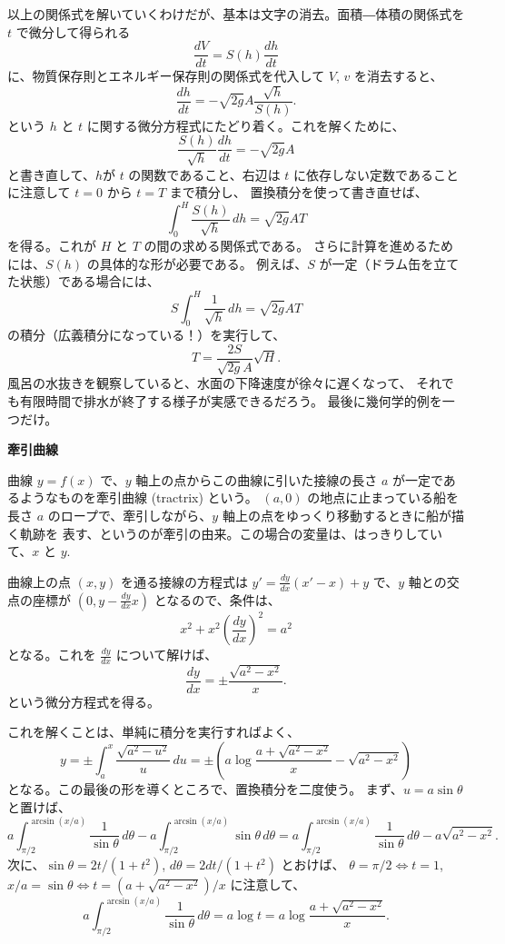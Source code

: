 \documentclass[a4paper]{jsarticle}
\theoremstyle{definition}
\theoremstyle{remark}
\begin{document}
以上の関係式を解いていくわけだが、基本は文字の消去。面積―体積の関係式を $t$ で微分して得られる
\[
\frac{dV}{dt} = S(h) \frac{dh}{dt}
\]
に、物質保存則とエネルギー保存則の関係式を代入して $V$, $v$ を消去すると、
\[
\frac{dh}{dt} = -\sqrt{2g}A \frac{\sqrt{h}}{S(h)}. 
\]
という $h$ と $t$ に関する微分方程式にたどり着く。これを解くために、
\[
\frac{S(h)}{\sqrt{h}} \frac{dh}{dt} = -\sqrt{2g} A 
\]
と書き直して、$h$が $t$ の関数であること、右辺は $t$ に依存しない定数であることに注意して 
$t=0$ から $t=T$ まで積分し、
置換積分を使って書き直せば、
\[
\int_0^H \frac{S(h)}{\sqrt{h}}\, dh = \sqrt{2g}AT
\]
を得る。これが $H$ と $T$ の間の求める関係式である。
さらに計算を進めるためには、$S(h)$ の具体的な形が必要である。
例えば、$S$ が一定（ドラム缶を立てた状態）である場合には、
\[
S\int_0^H \frac{1}{\sqrt{h}}\, dh = \sqrt{2g}AT
\]
の積分（広義積分になっている！）を実行して、
\[
T = \frac{2S}{\sqrt{2g}A}\sqrt{H}. 
\]
風呂の水抜きを観察していると、水面の下降速度が徐々に遅くなって、
それでも有限時間で排水が終了する様子が実感できるだろう。
最後に幾何学的例を一つだけ。


\bigskip
\noindent
\textbf{牽引曲線 }

曲線 $y = f(x)$ で、$y$ 軸上の点からこの曲線に引いた接線の長さ $a$ が一定であるようなものを牽引曲線 (tractrix) という。
$(a,0)$ の地点に止まっている船を長さ $a$ のロープで、牽引しながら、$y$ 軸上の点をゆっくり移動するときに船が描く軌跡を
表す、というのが牽引の由来。この場合の変量は、はっきりしていて、$x$ と $y$. 

曲線上の点 $(x,y)$ を通る接線の方程式は $y' = \frac{dy}{dx}(x' -x) + y$ で、$y$ 軸との交点の座標が
$(0, y - \frac{dy}{dx}x)$ となるので、条件は、
\[
x^2 + x^2 \left( \frac{dy}{dx} \right)^2 = a^2
\]
となる。これを $\frac{dy}{dx}$ について解けば、
\[
\frac{dy}{dx} = \pm \frac{\sqrt{a^2-x^2}}{x}. 
\]
という微分方程式を得る。

これを解くことは、単純に積分を実行すればよく、
\[
y = \pm \int_a^x \frac{\sqrt{a^2 - u^2}}{u}\, du = 
\pm 
\left(
a \log \frac{a + \sqrt{a^2 - x^2}}{x} - \sqrt{a^2-x^2}
\right)
\]
となる。この最後の形を導くところで、置換積分を二度使う。
まず、$u = a\sin \theta$ と置けば、
\[
a\int_{\pi/2}^{\arcsin(x/a)} \frac{1}{\sin\theta}\, d\theta - a\int_{\pi/2}^{\arcsin(x/a)} \sin\theta\, d\theta
= a\int_{\pi/2}^{\arcsin(x/a)} \frac{1}{\sin\theta}\, d\theta - a\sqrt{a^2-x^2}.  
\]
次に、$\sin\theta = 2t/(1+t^2)$, $d\theta = 2dt/(1+t^2)$ とおけば、
$\theta = \pi/2 \iff t=1$, $x/a = \sin\theta \iff t = (a + \sqrt{a^2-x^2})/x$ に注意して、
\[
a\int_{\pi/2}^{\arcsin(x/a)} \frac{1}{\sin\theta}\, d\theta 
= a\log t = a\log \frac{a + \sqrt{a^2-x^2}}{x}. 
\]
\end{document}
